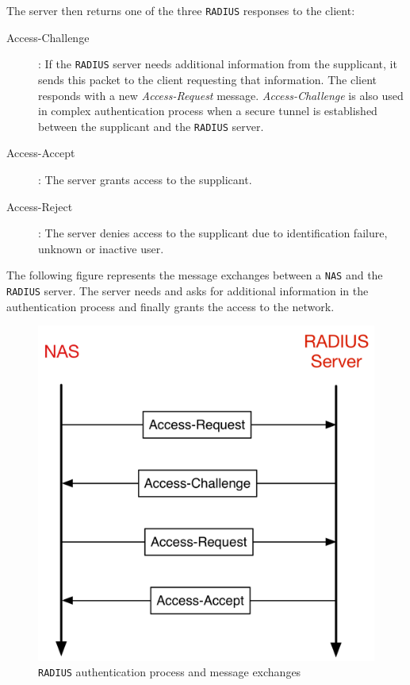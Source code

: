 The server then returns one of the three \texttt{RADIUS} responses to the client:
	\begin{description}
		\item [Access-Challenge]: If the \texttt{RADIUS} server needs additional information from the supplicant, it sends this packet to the client requesting that information. The client responds with a new \textit{Access-Request} message. \textit{Access-Challenge} is also used in complex authentication process when a secure tunnel is established between the supplicant and the \texttt{RADIUS} server.

		\item [Access-Accept]: The server grants access to the supplicant.

		\item [Access-Reject]: The server denies access to the supplicant due to identification failure, unknown or inactive user.
	\end{description}

The following figure represents the message exchanges between a \texttt{NAS} and the \texttt{RADIUS} server. The server needs and asks for additional information in the authentication process and finally grants the access to the network.

\begin{figure}[H]
	\begin{center}
		\includegraphics[width=.5\linewidth]{Pictures/chapter2/radius-authentication.png}
		\caption{\texttt{RADIUS} authentication process and message exchanges}
	\end{center}
\end{figure}
		
